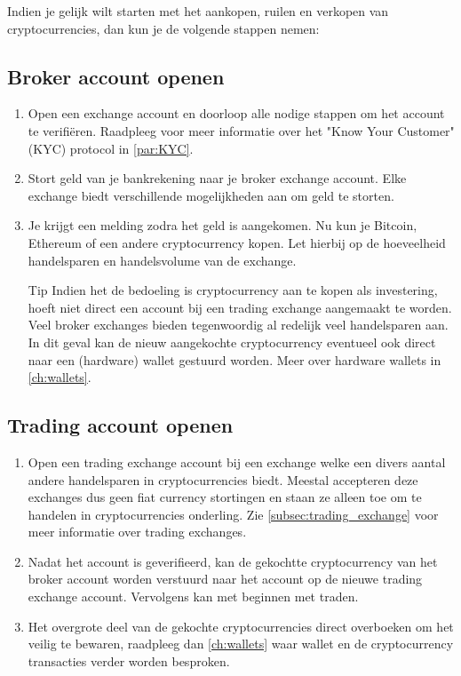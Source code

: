 Indien je gelijk wilt starten met het aankopen, ruilen en verkopen van cryptocurrencies, dan kun je de volgende stappen nemen:


\subsection*{Broker account openen}
\begin{enumerate}

    \item Open een exchange account en doorloop alle nodige stappen om het account te verifi{\"e}ren. Raadpleeg voor meer informatie over het "Know Your Customer" (KYC) protocol in \cref{par:KYC}.
    
    \item Stort geld van je bankrekening naar je broker exchange account. Elke exchange biedt verschillende mogelijkheden aan om geld te storten.
    
    \item Je krijgt een melding zodra het geld is aangekomen. Nu kun je Bitcoin, Ethereum of een andere cryptocurrency kopen. Let hierbij op de hoeveelheid handelsparen en handelsvolume van de exchange.\medskip
    
\begin{tipbox}{Tip}
          Indien het de bedoeling is cryptocurrency aan te kopen als investering, hoeft niet direct een account bij een trading exchange aangemaakt te worden. Veel broker exchanges bieden tegenwoordig al redelijk veel handelsparen aan. In dit geval kan de nieuw aangekochte cryptocurrency eventueel ook direct naar een (hardware) wallet gestuurd worden. Meer over hardware wallets in \cref{ch:wallets}.
\end{tipbox}
 
 \end{enumerate}
 
 \subsection*{Trading account openen}
 \begin{enumerate}[resume]
    \item Open een trading exchange account bij een exchange welke een divers aantal andere handelsparen in cryptocurrencies biedt. Meestal accepteren deze exchanges dus geen fiat currency stortingen en staan ze alleen toe om te handelen in cryptocurrencies onderling. Zie \cref{subsec:trading_exchange} voor meer informatie over trading exchanges.
    
    \item Nadat het account is geverifieerd, kan de gekochtte cryptocurrency van het broker account worden verstuurd naar het account op de nieuwe trading exchange account. Vervolgens kan met beginnen met traden. 
    
    \item  Het overgrote deel van de gekochte cryptocurrencies direct overboeken om het veilig te bewaren, raadpleeg dan \cref{ch:wallets} waar wallet en de cryptocurrency transacties verder worden besproken.
\end{enumerate}


